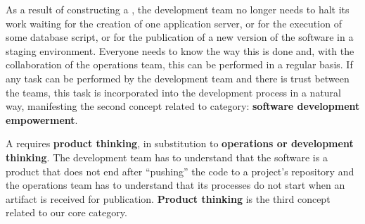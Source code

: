 
As a result of constructing a \cc, the development
team no longer needs to halt its work waiting for the creation
of one application server, or for the execution of some database script, or for
the publication of a new version of the software in a staging environment.
Everyone needs to know the way this is done and, with the collaboration of the
operations team, this can be performed in a regular basis. If any task can be
performed by the development team and there is trust between the teams, this task is
incorporated into the development process in a natural way, manifesting the
second concept related to \cc category: \textbf{software
development empowerment}.


A \cc requires  \textbf{product thinking}, in substitution to
\textbf{operations or development thinking}. The development team has to understand that
the software is a product that does not end after ``pushing'' the code to a
project's repository and the operations team has to understand that its
processes do not start when an artifact is received for publication. \textbf{Product thinking}
is the third concept related to our core category.


